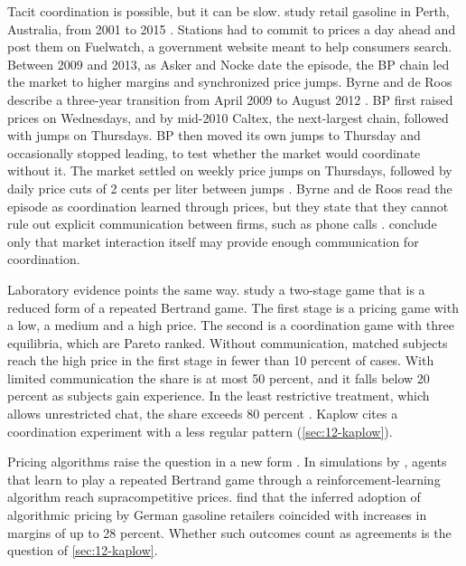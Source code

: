 Tacit coordination is possible, but it can be slow. \citet{ByrneDeRoos2019} study retail gasoline in Perth, Australia,
from 2001 to 2015 \citep[pp.~189--191]{AskerNocke2021}. Stations had to commit to prices a day ahead and post them
on Fuelwatch, a government website meant to help consumers search. Between 2009 and 2013, as Asker and Nocke date the
episode, the BP chain led the market to higher margins and synchronized price jumps. Byrne and de Roos describe a
three-year transition from April 2009 to August 2012 \citep[p.~592]{ByrneDeRoos2019}. BP first raised prices on Wednesdays, and by mid-2010 Caltex, the
next-largest chain, followed with jumps on Thursdays. BP then moved its own jumps to Thursday and occasionally
stopped leading, to test whether the market would coordinate without it. The market settled on weekly price jumps
on Thursdays, followed by daily price cuts of 2 cents per liter between jumps
\citep[pp.~596--597 and 607--608]{ByrneDeRoos2019}. Byrne and de Roos read the episode as coordination learned
through prices, but they state that they cannot rule out explicit communication between firms, such as phone calls
\citep[p.~617]{ByrneDeRoos2019}. \citet[p.~191]{AskerNocke2021} conclude only that market interaction itself may
provide enough communication for coordination.

Laboratory evidence points the same way. \citet{CooperKuhn2014} study a two-stage game that is a reduced form of a
repeated Bertrand game. The first stage is a pricing game with a low, a medium and a high price. The second is a
coordination game with three equilibria, which are Pareto ranked. Without communication, matched subjects reach the
high price in the first stage in fewer than 10 percent of cases. With limited communication the share is at most 50
percent, and it falls below 20 percent as subjects gain experience. In the least restrictive treatment, which allows
unrestricted chat, the share exceeds 80 percent \citep[p.~191]{AskerNocke2021}. Kaplow cites a coordination
experiment with a less regular pattern (\cref{sec:12-kaplow}).

Pricing algorithms raise the question in a new form \citep[p.~192]{AskerNocke2021}. In simulations by
\citet{CalvanoEtAl2020}, agents that learn to play a repeated Bertrand game through a reinforcement-learning
algorithm reach supracompetitive prices. \citet{AssadEtAl2020} find that the inferred adoption of algorithmic
pricing by German gasoline retailers coincided with increases in margins of up to 28 percent. Whether such outcomes
count as agreements is the question of \cref{sec:12-kaplow}.

